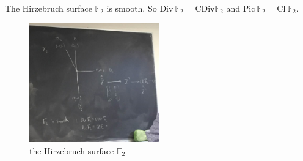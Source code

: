 \documentclass[a4paper,12pt]{amsart}
\newcommand{\FF}{\mathbb{F}}
\newcommand{\CDiv}{\mathrm{CDiv}}
\newcommand{\Picard}{\mathrm{Pic}~}
\newcommand{\Cl}{\mathrm{Cl}~}
\newcommand{\Divisor}{\mathrm{Div}~}
\begin{document}
\begin{Eg}The Hirzebruch surface $\FF_2$ is smooth. So $\Divisor \FF_2=\CDiv\FF_2$ and $\Picard\FF_2=\Cl\FF_2$.
		\begin{figure}[h]
			\centering
			\includegraphics[width=0.5\textwidth]{pic/Apr11_eg2}
			\caption*{the Hirzebruch surface $\FF_2$}
		\end{figure}
\end{Eg}
\end{document}

